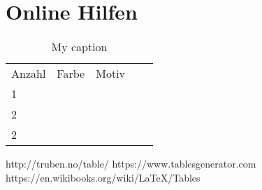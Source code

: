 \section{Online Hilfen}

\begin{table}[h]
	\centering
	\caption{My caption}
	\label{my-label}
	\begin{tabular}{lllll}
		Anzahl & Farbe & Motiv &  &  \\
		1      &       &       &  &  \\
		2      &       &       &  &  \\
		2      &       &       &  & 
	\end{tabular}
\end{table}

http://truben.no/table/
https://www.tablesgenerator.com
https://en.wikibooks.org/wiki/LaTeX/Tables



